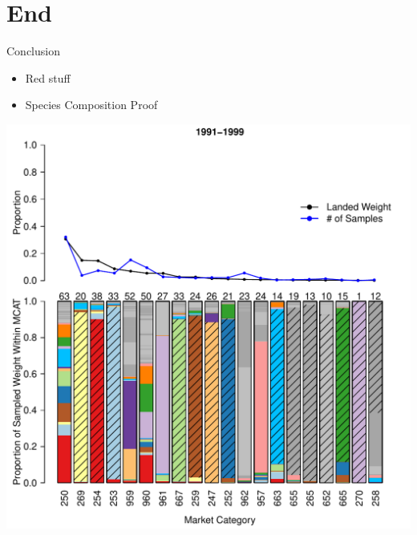 \documentclass[ xcolor = pdftex, dvipsnames, table ]{beamer}
\begin{document}
%
%

\section{End}
\begin{frame}{Conclusion}
\begin{itemize}
\item {\color{red}Red stuff}
\item Species Composition Proof
\end{itemize}
\end{frame}

%
%

%
\begin{frame}
\centering
\includegraphics[height=\textheight]{../pictures/1991to1999Bar3.pdf}

\end{frame}
\end{document}
